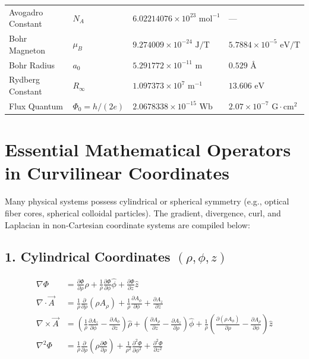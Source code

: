 \begin{center}
\begin{tabularx}{\textwidth}{l l l X}
Avogadro Constant & $N_A$ & $6.02214076 \times 10^{23}\text{ mol}^{-1}$ & --- \\
Bohr Magneton & $\mu_B$ & $9.274009 \times 10^{-24}\text{ J/T}$ & $5.7884 \times 10^{-5}\text{ eV/T}$ \\
Bohr Radius & $a_0$ & $5.291772 \times 10^{-11}\text{ m}$ & $0.529\text{ \AA}$ \\
Rydberg Constant & $R_\infty$ & $1.097373 \times 10^7\text{ m}^{-1}$ & $13.606\text{ eV}$ \\
Flux Quantum & $\Phi_0 = h/(2e)$ & $2.0678338 \times 10^{-15}\text{ Wb}$ & $2.07\times 10^{-7}\text{ G}\cdot\text{cm}^2$ \\
\bottomrule
\end{tabularx}
\end{center}

\section{Essential Mathematical Operators in Curvilinear Coordinates}
Many physical systems possess cylindrical or spherical symmetry (e.g., optical fiber cores, spherical colloidal particles). The gradient, divergence, curl, and Laplacian in non-Cartesian coordinate systems are compiled below:

\subsection{1. Cylindrical Coordinates $(\rho, \phi, z)$}
\begin{align}
\nabla \Phi &= \frac{\partial \Phi}{\partial \rho}\hat{\rho} + \frac{1}{\rho}\frac{\partial \Phi}{\partial \phi}\hat{\phi} + \frac{\partial \Phi}{\partial z}\hat{z} \\
\nabla \cdot \vec{A} &= \frac{1}{\rho}\frac{\partial}{\partial \rho}(\rho A_\rho) + \frac{1}{\rho}\frac{\partial A_\phi}{\partial \phi} + \frac{\partial A_z}{\partial z} \\
\nabla \times \vec{A} &= \left(\frac{1}{\rho}\frac{\partial A_z}{\partial \phi} - \frac{\partial A_\phi}{\partial z}\right)\hat{\rho} + \left(\frac{\partial A_\rho}{\partial z} - \frac{\partial A_z}{\partial \rho}\right)\hat{\phi} + \frac{1}{\rho}\left(\frac{\partial(\rho A_\phi)}{\partial \rho} - \frac{\partial A_\rho}{\partial \phi}\right)\hat{z} \\
\nabla^2 \Phi &= \frac{1}{\rho}\frac{\partial}{\partial \rho}\left(\rho \frac{\partial \Phi}{\partial \rho}\right) + \frac{1}{\rho^2}\frac{\partial^2 \Phi}{\partial \phi^2} + \frac{\partial^2 \Phi}{\partial z^2}
\end{align}

